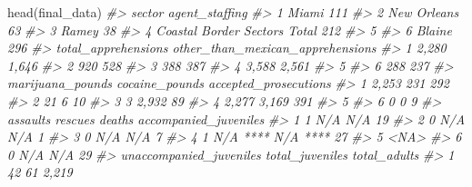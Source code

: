 \documentclass[
]{krantz}
\makeatletter
\newenvironment{Shaded}{\begin{snugshade}}{\end{snugshade}}
\newcommand{\CommentTok}[1]{\textcolor[rgb]{0.37,0.37,0.37}{\textit{#1}}}
\newcommand{\FunctionTok}[1]{\textcolor[rgb]{0,0,0}{#1}}
\newcommand{\NormalTok}[1]{#1}
\newenvironment{kframe}{%
\medskip{}
\setlength{\fboxsep}{.8em}
 \def\at@end@of@kframe{}%
 \ifinner\ifhmode%
  \def\at@end@of@kframe{\end{minipage}}%
  \begin{minipage}{\columnwidth}%
 \fi\fi%
 \def\FrameCommand##1{\hskip\@totalleftmargin \hskip-\fboxsep
 \colorbox{shadecolor}{##1}\hskip-\fboxsep
     \hskip-\linewidth \hskip-\@totalleftmargin \hskip\columnwidth}%
 \MakeFramed {\advance\hsize-\width
   \@totalleftmargin\z@ \linewidth\hsize
   \@setminipage}}%
 {\par\unskip\endMakeFramed%
 \at@end@of@kframe}
\renewenvironment{Shaded}{\begin{kframe}}{\end{kframe}}
\makeatother
\begin{document}
\begin{Shaded}
\begin{Highlighting}[]
\FunctionTok{head}\NormalTok{(final\_data)}
\CommentTok{\#\textgreater{}                         sector agent\_staffing}
\CommentTok{\#\textgreater{} 1                        Miami            111}
\CommentTok{\#\textgreater{} 2                  New Orleans             63}
\CommentTok{\#\textgreater{} 3                        Ramey             38}
\CommentTok{\#\textgreater{} 4 Coastal Border Sectors Total            212}
\CommentTok{\#\textgreater{} 5                                            }
\CommentTok{\#\textgreater{} 6                       Blaine            296}
\CommentTok{\#\textgreater{}   total\_apprehensions other\_than\_mexican\_apprehensions}
\CommentTok{\#\textgreater{} 1               2,280                            1,646}
\CommentTok{\#\textgreater{} 2                 920                              528}
\CommentTok{\#\textgreater{} 3                 388                              387}
\CommentTok{\#\textgreater{} 4               3,588                            2,561}
\CommentTok{\#\textgreater{} 5                                                     }
\CommentTok{\#\textgreater{} 6                 288                              237}
\CommentTok{\#\textgreater{}   marijuana\_pounds cocaine\_pounds accepted\_prosecutions}
\CommentTok{\#\textgreater{} 1            2,253            231                   292}
\CommentTok{\#\textgreater{} 2               21              6                    10}
\CommentTok{\#\textgreater{} 3                3          2,932                    89}
\CommentTok{\#\textgreater{} 4            2,277          3,169                   391}
\CommentTok{\#\textgreater{} 5                                                      }
\CommentTok{\#\textgreater{} 6                0              0                     9}
\CommentTok{\#\textgreater{}   assaults  rescues   deaths accompanied\_juveniles}
\CommentTok{\#\textgreater{} 1        1      N/A      N/A                    19}
\CommentTok{\#\textgreater{} 2        0      N/A      N/A                     1}
\CommentTok{\#\textgreater{} 3        0      N/A      N/A                     7}
\CommentTok{\#\textgreater{} 4        1 N/A **** N/A ****                    27}
\CommentTok{\#\textgreater{} 5                                             \textless{}NA\textgreater{}}
\CommentTok{\#\textgreater{} 6        0      N/A      N/A                    29}
\CommentTok{\#\textgreater{}   unaccompanied\_juveniles total\_juveniles total\_adults}
\CommentTok{\#\textgreater{} 1                      42              61        2,219}

\end{Highlighting}
\end{Shaded}
\end{document}
